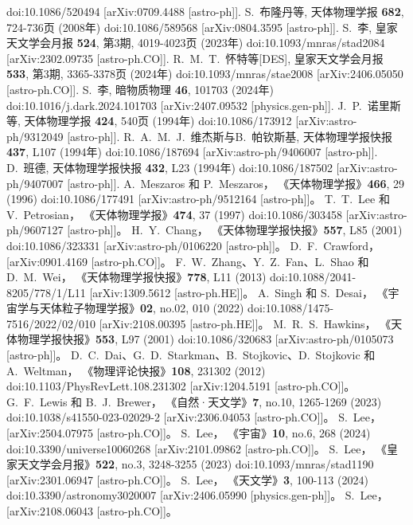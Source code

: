 \documentclass[jkps,preprint,fleqn]{revtex4}
\begin{document}
\begin{CJK*}{UTF8}{gbsn}
\begin{thebibliography}{999}
doi:10.1086/520494
[arXiv:0709.4488 [astro-ph]].
S.~布隆丹等,
天体物理学报 \textbf{682}, 724-736页 (2008年)
doi:10.1086/589568
[arXiv:0804.3595 [astro-ph]].
S.~李,
皇家天文学会月报 \textbf{524}, 第3期, 4019-4023页 (2023年)
doi:10.1093/mnras/stad2084
[arXiv:2302.09735 [astro-ph.CO]].
R.~M.~T.~怀特等[DES],
皇家天文学会月报 \textbf{533}, 第3期, 3365-3378页 (2024年)
doi:10.1093/mnras/stae2008
[arXiv:2406.05050 [astro-ph.CO]].
S.~李,
暗物质物理 \textbf{46}, 101703 (2024年)
doi:10.1016/j.dark.2024.101703
[arXiv:2407.09532 [physics.gen-ph]].
J.~P.~诺里斯等,
天体物理学报 \textbf{424}, 540页 (1994年)
doi:10.1086/173912
[arXiv:astro-ph/9312049 [astro-ph]].
R.~A.~M.~J.~维杰斯与B.~帕钦斯基,
天体物理学报快报 \textbf{437}, L107 (1994年)
doi:10.1086/187694
[arXiv:astro-ph/9406007 [astro-ph]].
D.~班德,
天体物理学报快报 \textbf{432}, L23 (1994年)
doi:10.1086/187502
[arXiv:astro-ph/9407007 [astro-ph]].
A.~Meszaros 和 P.~Meszaros，
《天体物理学报》\textbf{466}, 29 (1996)
doi:10.1086/177491
[arXiv:astro-ph/9512164 [astro-ph]]。
T.~T.~Lee 和 V.~Petrosian，
《天体物理学报》\textbf{474}, 37 (1997)
doi:10.1086/303458
[arXiv:astro-ph/9607127 [astro-ph]]。
H.~Y.~Chang，
《天体物理学报快报》\textbf{557}, L85 (2001)
doi:10.1086/323331
[arXiv:astro-ph/0106220 [astro-ph]]。
D.~F.~Crawford，
[arXiv:0901.4169 [astro-ph.CO]]。
F.~W.~Zhang、Y.~Z.~Fan、L.~Shao 和 D.~M.~Wei，
《天体物理学报快报》\textbf{778}, L11 (2013)
doi:10.1088/2041-8205/778/1/L11
[arXiv:1309.5612 [astro-ph.HE]]。
A.~Singh 和 S.~Desai，
《宇宙学与天体粒子物理学报》\textbf{02}, no.02, 010 (2022)
doi:10.1088/1475-7516/2022/02/010
[arXiv:2108.00395 [astro-ph.HE]]。
M.~R.~S.~Hawkins，
《天体物理学报快报》\textbf{553}, L97 (2001)
doi:10.1086/320683
[arXiv:astro-ph/0105073 [astro-ph]]。
D.~C.~Dai、G.~D.~Starkman、B.~Stojkovic、D.~Stojkovic 和 A.~Weltman，
《物理评论快报》\textbf{108}, 231302 (2012)
doi:10.1103/PhysRevLett.108.231302
[arXiv:1204.5191 [astro-ph.CO]]。
G.~F.~Lewis 和 B.~J.~Brewer，
《自然·天文学》\textbf{7}, no.10, 1265-1269 (2023)
doi:10.1038/s41550-023-02029-2
[arXiv:2306.04053 [astro-ph.CO]]。
S.~Lee，
[arXiv:2504.07975 [astro-ph.CO]]。
S.~Lee，
《宇宙》\textbf{10}, no.6, 268 (2024)
doi:10.3390/universe10060268
[arXiv:2101.09862 [astro-ph.CO]]。
S.~Lee，
《皇家天文学会月报》\textbf{522}, no.3, 3248-3255 (2023)
doi:10.1093/mnras/stad1190
[arXiv:2301.06947 [astro-ph.CO]]。
S.~Lee，
《天文学》\textbf{3}, 100-113 (2024)
doi:10.3390/astronomy3020007
[arXiv:2406.05990 [physics.gen-ph]]。
S.~Lee，
[arXiv:2108.06043 [astro-ph.CO]]。
\end{thebibliography}
\end{CJK*}
\end{document}
